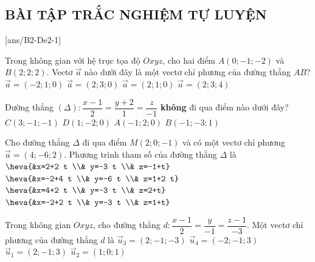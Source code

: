 \subsection{BÀI TẬP TRẮC NGHIỆM TỰ LUYỆN}
\TN
	\setcounter{ex}{0}
	[ans/B2-De2-1]
\begin{ex}%
	Trong không gian với hệ trục tọa độ $O x y z$, cho hai điểm $A(0 ;-1 ;-2)$ và $B(2 ; 2 ; 2)$. Vectơ $\overrightarrow{a}$ nào dưới đây là một vectơ chỉ phương của đường thẳng $A B$?
	\choice
	{$\overrightarrow{a}=(-2 ; 1 ; 0)$}
	{$\overrightarrow{a}=(2 ; 3 ; 0)$}
	{$\overrightarrow{a}=(2 ; 1 ; 0)$}
	{\True $\overrightarrow{a}=(2 ; 3 ; 4)$}
\end{ex}

\begin{ex}%
	Đường thẳng $(\Delta)\colon \dfrac{x-1}{2}=\dfrac{y+2}{1}=\dfrac{z}{-1}$ \textbf{không} đi qua điểm nào dưới đây?
	\choice
	{$C(3 ;-1 ;-1)$}
	{$D(1 ;-2 ; 0)$}
	{\True $A(-1 ; 2 ; 0)$}
	{$B(-1 ;-3 ; 1)$}
\end{ex}

\begin{ex}%
	Cho đường thẳng $\Delta$ đi qua điểm $M(2 ; 0 ;-1)$ và có một vectơ chỉ phương $\overrightarrow{a}=(4 ;-6 ; 2)$. Phương trình tham số của đường thẳng $\Delta$ là
	\choice
	{\True $\heva{&x=2+2 t \\& y=-3 t \\& z=-1+t}$}
	{$\heva{&x=-2+4 t \\& y=-6 t \\& z=1+2 t}$}
	{$\heva{&x=4+2 t \\& y=-3 t \\& z=2+t}$}
	{$\heva{&x=-2+2 t \\& y=-3 t \\& z=1+t}$}
\end{ex}

\begin{ex}%
	Trong không gian $Oxyz$, cho đường thẳng $d\colon \dfrac{x-1}{2}=\dfrac{y}{-1}=\dfrac{z-1}{-3}$. Một vectơ chỉ phương của đường thẳng $d$ là
	\choice
	{\True $\overrightarrow{u}_3=(2 ; -1 ; -3)$}
	{$\overrightarrow{u}_4=(-2 ;-1 ; 3)$}
	{$\overrightarrow{u}_1=(2 ;-1 ; 3)$}
	{ $\overrightarrow{u}_2=(1 ; 0 ; 1)$}
\end{ex}

